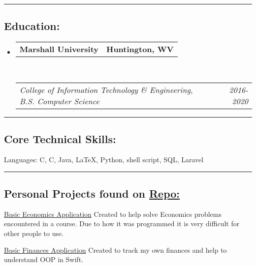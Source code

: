 \documentclass[10pt,letterpaper]{article}
\makeatletter
\newenvironment{indentsection}[1]%
{\begin{list}{}%
	{\setlength{\leftmargin}{#1}}%
	\item[]%
}
{\end{list}}
\newcommand{\headerrow}[2]
{\begin{tabular*}{\linewidth}{l@{\extracolsep{\fill}}r}
	#1 &
	#2 \\
\end{tabular*}}
\newcommand{\CPP}
{C\nolinebreak[4]\hspace{-.05em}\raisebox{.22ex}{\footnotesize\bf ++}}
\makeatother
\begin{document}
\hrule
\vspace{-0.4em}
\subsection*{Education:}

\begin{itemize}
	\parskip=0.1em

	\item 
	\headerrow
		{\textbf{Marshall University}}
		{\textbf{Huntington, WV}}
	\\
	\headerrow
		{\emph{College of Information Technology \& Engineering, B.S. Computer Science}}
		{\emph{2016-2020}}

\end{itemize}


\hrule
\vspace{-0.4em}
\subsection*{Core Technical Skills:}

\begin{indentsection}{\parindent}
\begin{description*}
	\item[Languages:]
	C, \CPP, Java, \LaTeX, Python, shell script, SQL, Laravel
\end{description*}
\end{indentsection}

\hrule
\vspace{-0.4em}
\subsection*{Personal Projects found on \href{https://github.com/jeremyggiese/jgieseRepo}{Repo:}}

\begin{indentsection}{\parindent}
\begin{description*}
	\item[\href{https://github.com/jeremyggiese/jgieseRepo/tree/master/Economics}{Basic Economics Application}]
	Created to help solve Economics problems encountered in a course. Due to how it was programmed it is very difficult for other people to use.
	\item[\href{https://github.com/jeremyggiese/jgieseRepo/tree/master/iOS/Finances}{Basic Finances Application}]
	Created to track my own finances and help to understand OOP in Swift.
\end{description*}
\end{indentsection}
\end{document}
